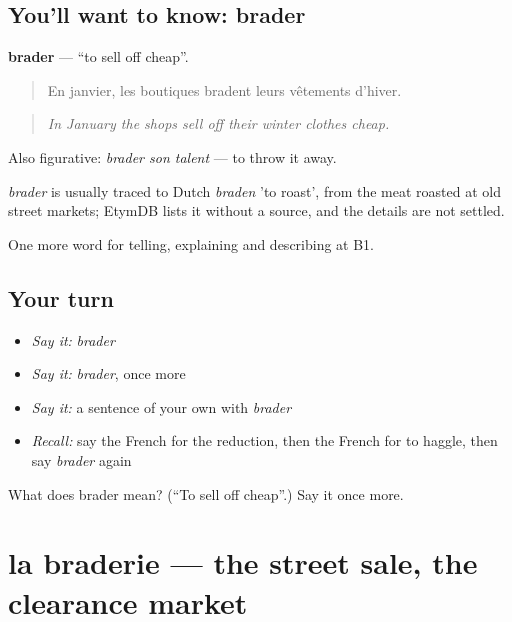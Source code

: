 \subsection*{You'll want to know: brader}
\textbf{brader} — \textquotedblleft{}to sell off cheap\textquotedblright{}.

\begin{quote}
En janvier, les boutiques bradent leurs vêtements d'hiver.
\end{quote}

\begin{quote}
\emph{In January the shops sell off their winter clothes cheap.}
\end{quote}

Also figurative: \emph{brader son talent} — to throw it away.

\begin{cousinweb}
\emph{brader} is usually traced to Dutch \emph{braden} 'to roast', from the meat roasted at old street markets; EtymDB lists it without a source, and the details are not settled.
\end{cousinweb}

\begin{grammarlens}[title={What you've built}]
One more word for telling, explaining and describing at B1.
\end{grammarlens}

\subsection*{Your turn}
\begin{itemize}
\raggedright
  \item \emph{Say it:} \emph{brader}
  \item \emph{Say it:} \emph{brader}, once more
  \item \emph{Say it:} a sentence of your own with \emph{brader}
  \item \emph{Recall:} say the French for the reduction, then the French for to haggle, then say \emph{brader} again
\end{itemize}

\begin{tcolorbox}[breakable,colback=teal!4,colframe=teal!35!black,title={Before you move on}]
What does brader mean? (\textquotedblleft{}To sell off cheap\textquotedblright{}.) Say it once more.
\end{tcolorbox}
\section[la braderie]{la braderie — the street sale, the clearance market}

